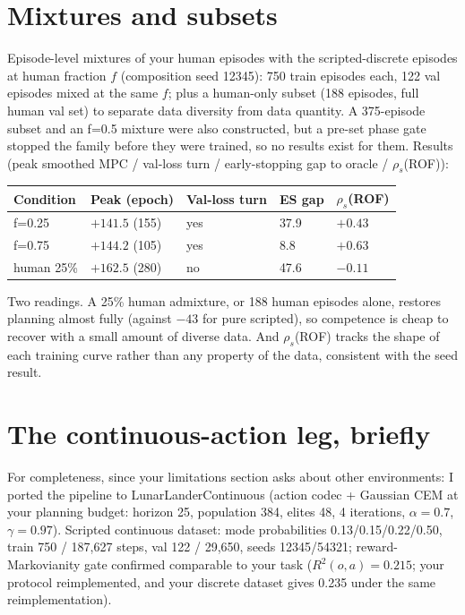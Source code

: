 \documentclass[11pt]{article}
\begin{document}
\section{Mixtures and subsets}\label{mixtures-and-subsets}

Episode-level mixtures of your human episodes with the scripted-discrete
episodes at human fraction \(f\) (composition seed 12345): 750 train
episodes each, 122 val episodes mixed at the same \(f\); plus a human-only
subset (188 episodes, full human val set) to separate data diversity
from data quantity. A 375-episode subset and an f=0.5 mixture were also
constructed, but a pre-set phase gate stopped the family before they
were trained, so no results exist for them. Results (peak smoothed MPC / val-loss turn
/ early-stopping gap to oracle / \(\rho_s\)(ROF)):

\begin{longtable}[]{@{}lllll@{}}
\toprule\noalign{}
Condition & Peak (epoch) & Val-loss turn & ES gap & \(\rho_s\)(ROF) \\
\midrule\noalign{}
\endhead
\bottomrule\noalign{}
\endlastfoot
f=0.25 & \(+141.5\) (155) & yes & 37.9 & \(+0.43\) \\
f=0.75 & \(+144.2\) (105) & yes & 8.8 & \(+0.63\) \\
human 25\% & \(+162.5\) (280) & no & 47.6 & \(-0.11\) \\
\end{longtable}

Two readings. A 25\% human admixture, or 188 human episodes alone,
restores planning almost fully (against \(-43\) for pure scripted), so
competence is cheap to recover with a small amount of diverse data. And
\(\rho_s\)(ROF) tracks the shape of each training curve rather than any
property of the data, consistent with the seed result.

\section{The continuous-action leg,
briefly}\label{the-continuous-action-leg-briefly}

For completeness, since your limitations section asks about other
environments: I ported the pipeline to LunarLanderContinuous (action
codec + Gaussian CEM at your planning budget: horizon 25, population
384, elites 48, 4 iterations, \(\alpha = 0.7\), \(\gamma = 0.97\)).
Scripted continuous dataset: mode probabilities 0.13/0.15/0.22/0.50,
train 750 / 187,627 steps, val 122 / 29,650, seeds 12345/54321;
reward-Markovianity gate confirmed comparable to your task
(\(R^2(o,a) = 0.215\); your protocol reimplemented, and your discrete
dataset gives 0.235 under the same reimplementation).
\end{document}
